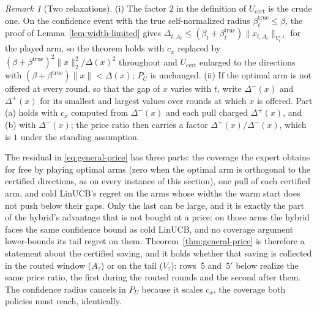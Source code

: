\documentclass{article}
\theoremstyle{definition}
\theoremstyle{remark}
\newtheorem{remark}{Remark}
\theoremstyle{remark}
\begin{document}
\begin{remark}[Two relaxations]
\label{rem:relaxations}
(i) The factor $2$ in the definition of $U_{\mathrm{cert}}$ is the crude
one. On the confidence event with the true self-normalized radius
$\beta^{\mathrm{true}}_t\le\beta$, the proof of Lemma~\ref{lem:width-limited}
gives $\Delta_{t,A_t}\le(\beta_t+\beta^{\mathrm{true}}_t)\|x_{t,A_t}\|_{V_t^{-1}}$
for the played arm, so the theorem holds with $c_x$ replaced by
$(\beta+\beta^{\mathrm{true}})^2\|x\|_2^2/\Delta(x)^2$ throughout and
$U_{\mathrm{cert}}$ enlarged to the directions with
$(\beta+\beta^{\mathrm{true}})\|x\|<\Delta(x)$; $P_U$ is unchanged. (ii) If the
optimal arm is not offered at every round, so that the gap of $x$ varies
with $t$, write $\Delta^-(x)$ and $\Delta^+(x)$ for its smallest and largest
values over rounds at which $x$ is offered. Part (a) holds with $c_x$ computed
from $\Delta^-(x)$ and each pull charged $\Delta^+(x)$, and (b) with
$\Delta^-(x)$; the price ratio then carries a factor $\Delta^+(x)/\Delta^-(x)$,
which is $1$ under the standing assumption.
\end{remark}

The residual in \eqref{eq:general-price} has three parts: the coverage the
expert obtains for free by playing optimal arms (zero when the optimal arm is
orthogonal to the certified directions, as on every instance of this
section), one pull of each certified arm, and cold LinUCB's regret on the arms
whose widths the warm start does not push below their gaps. Only the last can
be large, and it is exactly the part of the hybrid's advantage that is not
bought at a price: on those arms the hybrid faces the same confidence bound
as cold LinUCB, and no coverage argument lower-bounds its tail regret on them.
Theorem~\ref{thm:general-price} is therefore a statement about the certified
saving, and it holds whether that saving is collected in the routed window
($A_\tau$) or on the tail ($V_\tau$): rows~5 and~$5'$ below realize the same
price ratio, the first during the routed rounds and the second after them. The confidence radius cancels in $P_U$
because it scales $c_x$, the coverage both policies must reach, identically.
\end{document}
